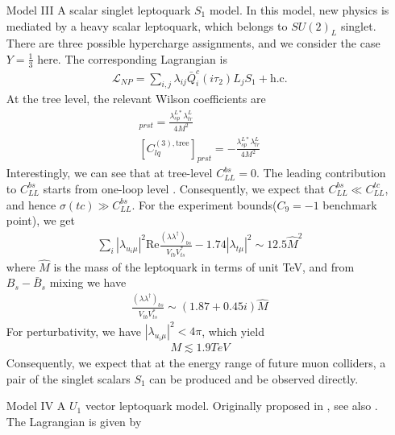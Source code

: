 \documentclass[a4paper,11pt]{article}
\begin{document}
\begin{enumerate}
    \item[Model III] A scalar singlet leptoquark $S_1$ model.
        In this model, new physics is mediated by a heavy scalar leptoquark, which belongs to $SU(2)_{L}$ singlet.
        There are three possible hypercharge assignments,
        and we consider the case $Y=\frac{1}{3}$ here.
        The corresponding Lagrangian is
        \begin{align}
            \mathcal{L}_{NP}=\sum_{i,j}\lambda_{ij}\bar{Q}^c_i(i\tau_2)L_jS_1+\textrm{h.c.}
        \end{align}
        At the tree level, the relevant Wilson coefficients are
        \begin{align}
            [C_{lq}^{(1),\textrm{tree}}]_{prst}=\frac{\lambda_{sp}^{L*}\lambda_{tr}^{L}}{4M^2}\\
            [C_{lq}^{(3),\textrm{tree}}]_{prst}=-\frac{\lambda_{sp}^{L*}\lambda_{tr}^{L}}{4M^2}
        \end{align}
        Interestingly, we can see that at tree-level $C_{LL}^{bs}=0$.
        The leading contribution to $C_{LL}^{bs}$ starts from one-loop level \cite{Bauer:2015knc}.
        Consequently, we expect that $C_{LL}^{bs}\ll C_{LL}^{tc}$,
        and hence $\sigma(tc)\gg C_{LL}^{bs}$.
        For the experiment bounds($C_9=-1$ benchmark point), we get
        \begin{align}
            \sum_{i}|\lambda_{u_i\mu}|^2\mathrm{Re}\frac{(\lambda\lambda^{\dag})_{bs}}{V_{tb}V_{ts}^{*}}-1.74|\lambda_{t\mu}|^2\sim 12.5\hat{M}^2
        \end{align}
        where $\hat{M}$ is the mass of the leptoquark in terms of unit TeV,
        and from $B_s-\bar{B}_s$ mixing we have
        \begin{align}
            \frac{(\lambda\lambda^{\dag})_{bs}}{V_{tb}V_{ts}^{*}}\sim(1.87+0.45i)\hat{M}
        \end{align}
        For perturbativity, we have $|\lambda_{u_i\mu}|^2<4\pi$, which yield
        \begin{align}
            M\lesssim 1.9\si{TeV}
        \end{align}
        Consequently, we expect that at the energy range of future muon colliders, a pair of the singlet scalars $S_1$  can be produced and be observed directly.
\item[Model IV] A $U_1$ vector leptoquark model. Originally proposed in \cite{Barbieri:2015yvd},
see also \cite{Buttazzo:2017ixm}.
        The Lagrangian is given by 
        \begin{align}

\end{align}
\end{enumerate}
\end{document}
